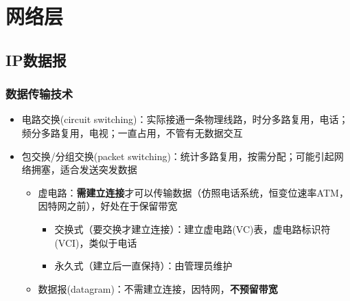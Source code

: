 
\section{网络层}
\subsection{IP数据报}
\subsubsection{数据传输技术}
\begin{itemize}
\item 电路交换(circuit switching)：实际接通一条物理线路，时分多路复用，电话；频分多路复用，电视；一直占用，不管有无数据交互
\item 包交换/分组交换(packet switching)：统计多路复用，按需分配；可能引起网络拥塞，适合发送突发数据
\begin{itemize}
	\item 虚电路：\textbf{需建立连接}才可以传输数据（仿照电话系统，恒变位速率ATM，因特网之前），好处在于保留带宽
	\begin{itemize}
	    \item 交换式（要交换才建立连接）：建立虚电路(VC)表，虚电路标识符(VCI)，类似于电话
	    \item 永久式（建立后一直保持）：由管理员维护
	\end{itemize}
	\item 数据报(datagram)：不需建立连接，因特网，\textbf{不预留带宽}
\end{itemize}
\end{itemize}

